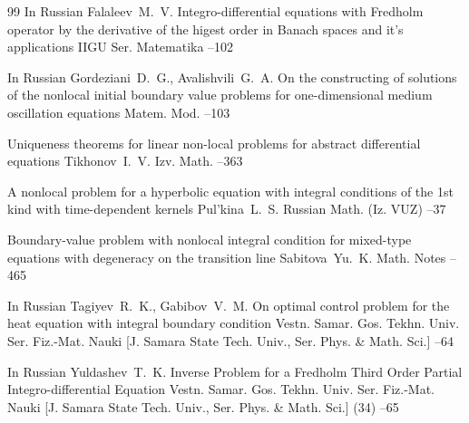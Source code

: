 \begin{thebibliography}{99}
\lang In Russian
\by Falaleev~M.~V.
\paper Integro-differential equations with Fredholm operator by the derivative of the higest order in Banach spaces and it's applications
\jour IIGU Ser. Matematika
--102

\lang In Russian
\by Gordeziani~D.~G., Avalishvili~G.~A.
\paper On the constructing of solutions of the nonlocal initial boundary value problems for one-dimensional medium oscillation equations
\jour Matem. Mod.
--103

\paper Uniqueness theorems for linear non-local problems for abstract differential equations
\by Tikhonov~I.~V.
\jour Izv. Math.
--363

\paper A nonlocal problem for a hyperbolic equation with integral conditions of the 1st kind with time-dependent kernels
\by Pul'kina~L.~S.
\jour Russian Math. (Iz. VUZ)
--37

\paper Boundary-value problem with nonlocal integral condition for mixed-type equations with degeneracy on the transition line
\by Sabitova~Yu.~K.
\jour Math. Notes
--465

\lang In Russian
\by Tagiyev~R.~K., Gabibov~V.~M.
\paper On optimal control problem for the heat equation with integral boundary condition 
\jour  Vestn. Samar. Gos. Tekhn. Univ. Ser. Fiz.-Mat. Nauki \rm [J. Samara State Tech. Univ., Ser. Phys. \& Math. Sci.]
--64

\lang In Russian
\by Yuldashev~T.~K.
\paper Inverse Problem for a Fredholm Third Order Partial Integro-differential Equation
\jour  Vestn. Samar. Gos. Tekhn. Univ. Ser. Fiz.-Mat. Nauki \rm [J. Samara State Tech. Univ., Ser. Phys. \& Math. Sci.]
(34)
--65


\end{thebibliography}
